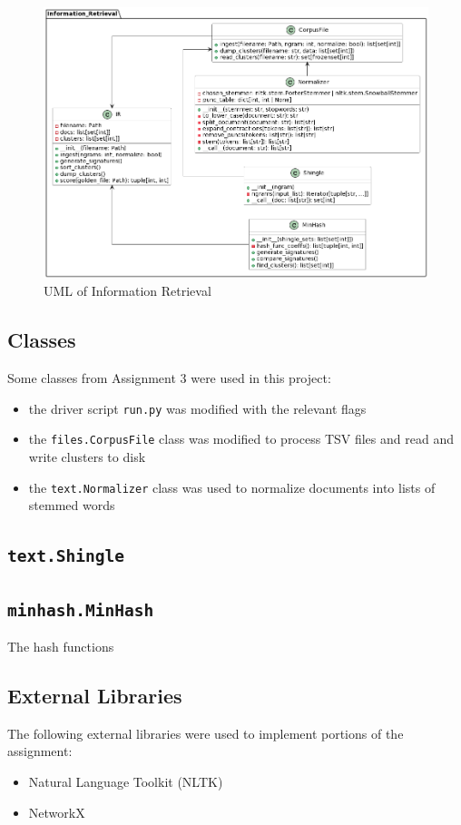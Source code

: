 \documentclass[11pt]{article}
\begin{document}
\begin{figure}[!ht]
  \includegraphics[scale=0.45]{statics/uml.png}
  \centering
  \caption{UML of Information Retrieval}
\end{figure}

\subsection{Classes}
Some classes from Assignment 3 were used in this project:
\begin{itemize}
  \item the driver script \texttt{run.py} was modified with the relevant flags
  \item the \texttt{files.CorpusFile} class was modified to process TSV files and read and write clusters to disk
  \item the \texttt{text.Normalizer} class was used to normalize documents into lists of stemmed words
\end{itemize}

\subsection{\texttt{text.Shingle}}

\subsection{\texttt{minhash.MinHash}}
The hash functions \cite{leskovec_rajaraman_ullman_2022}

\subsection{External Libraries}
The following external libraries were used to implement portions of the assignment:
\begin{itemize}
  \item Natural Language Toolkit (NLTK) \cite{bird2009natural}
  \item NetworkX \cite{SciPyProceedings_11}
\end{itemize}
\end{document}
